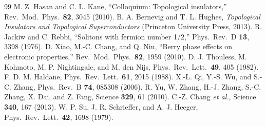 \documentclass{article}
\begin{document}
    \begin{thebibliography}{99}
         M. Z. Hasan and C. L. Kane, ``Colloquium: Topological insulators,'' Rev.\ Mod.\ Phys.\ \textbf{82}, 3045 (2010).
         B. A. Bernevig and T. L. Hughes, \emph{Topological Insulators and Topological Superconductors} (Princeton University Press, 2013).
         R. Jackiw and C. Rebbi, ``Solitons with fermion number 1/2,'' Phys.\ Rev.\ D \textbf{13}, 3398 (1976).
         D. Xiao, M.-C. Chang, and Q. Niu, ``Berry phase effects on electronic properties,'' Rev.\ Mod.\ Phys.\ \textbf{82}, 1959 (2010).
         D. J. Thouless, M. Kohmoto, M. P. Nightingale, and M. den Nijs, Phys.\ Rev.\ Lett.\ \textbf{49}, 405 (1982).
         F. D. M. Haldane, Phys.\ Rev.\ Lett.\ \textbf{61}, 2015 (1988).
         X.-L. Qi, Y.-S. Wu, and S.-C. Zhang, Phys.\ Rev.\ B \textbf{74}, 085308 (2006).
         R. Yu, W. Zhang, H.-J. Zhang, S.-C. Zhang, X. Dai, and Z. Fang, Science \textbf{329}, 61 (2010).
         C.-Z. Chang \emph{et al.}, Science \textbf{340}, 167 (2013).
         W. P. Su, J. R. Schrieffer, and A. J. Heeger, Phys.\ Rev.\ Lett.\ \textbf{42}, 1698 (1979).
    \end{thebibliography}
\end{document}
